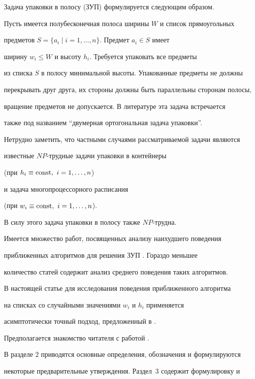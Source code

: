 Задача упаковки в полосу (ЗУП) формулируется следующим образом.


Пусть имеется полубесконечная полоса ширины $W$ и список прямоугольных


предметов $S=\{a_{i}\mid i=1,\dotsc,n\}$. Предмет $a_{i}\in S$ имеет


ширину $w_{i}\le W$ и высоту $h_{i}$. Требуется упаковать все предметы


из списка $S$ в полосу минимальной высоты. Упакованные предметы не должны


перекрывать друг друга, их стороны должны быть параллельны сторонам полосы,


вращение предметов не допускается. В литературе эта задача встречается


также под названием ``двумерная ортогональная задача упаковки''.





Нетрудно заметить, что частными случаями рассматриваемой задачи являются


известные $NP$-трудные задачи упаковки в контейнеры 


(при $h_{i} \equiv \operatorname{const},\ i=1,\dotsc,n $)


и задача многопроцессорного расписания 


(при $w_{i} \equiv \const,\ \n $).


В силу этого задача упаковки в полосу также $NP$-трудна.





Имеется множество работ, посвященных анализу наихудшего поведения 


приближенных алгоритмов для решения ЗУП \cite{CGJ}. Гораздо меньшее 


количество статей содержит анализ среднего поведения таких алгоритмов. 


В настоящей статье для исследования поведения приближенного алгоритма 


на списках со случайными значениями $w_{i}$ и $h_{i}$ применяется 


асимптотически точный подход, предложенный в \cite{GGP}.


Предполагается знакомство читателя с работой \cite{GZ}.





В разделе 2 приводятся основные определения, обозначения и формулируются 


некоторые предварительные утверждения. Раздел~3 содержит формулировку и 


